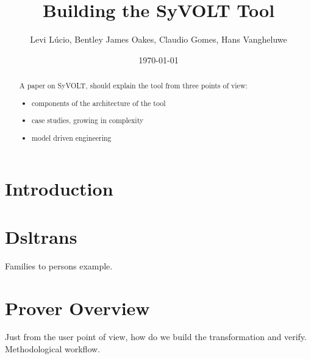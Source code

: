 \documentclass[conference]{IEEEtran}
\begin{document}
\title{Building the SyVOLT Tool}
\author{Levi L\'{u}cio, Bentley James Oakes, Claudio Gomes, Hans Vangheluwe}

\author{
	}

\date{\today}


\maketitle




\begin{abstract}
A paper on SyVOLT, should explain the tool from three points of view:
\begin{itemize}
  \item components of the architecture of the tool
  \item case studies, growing in complexity
  \item model driven engineering
\end{itemize}

\end{abstract}


\section{Introduction}
\label{sec:intro}


\section{Dsltrans}
Families to persons example.
\section{Prover Overview}
Just from the user point of view, how do we build the transformation and
verify.\\
Methodological workflow.
\end{document}
